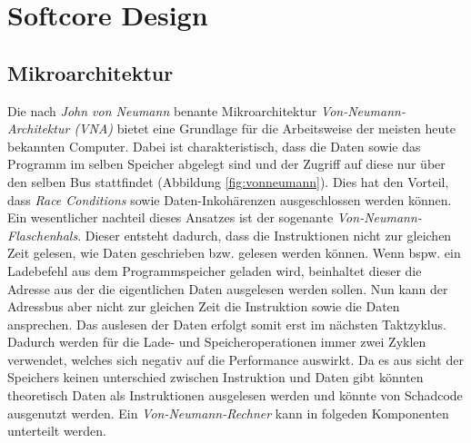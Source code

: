     \section{Softcore Design}

        \subsection{Mikroarchitektur}
            Die nach \textit{John von Neumann} benante Mikroarchitektur \textit{Von-Neumann-Architektur (VNA)}
            bietet eine Grundlage für die Arbeitsweise der meisten heute bekannten Computer.
            Dabei ist charakteristisch, dass die Daten sowie das Programm im selben Speicher abgelegt sind und
            der Zugriff auf diese nur über den selben Bus stattfindet (Abbildung \ref{fig:vonneumann}).
            Dies hat den Vorteil, dass \textit{Race Conditions} sowie Daten-Inkohärenzen ausgeschlossen werden können.
            Ein wesentlicher nachteil dieses Ansatzes ist der sogenante \textit{Von-Neumann-Flaschenhals}.
            Dieser entsteht dadurch, dass die Instruktionen nicht zur gleichen Zeit gelesen,
            wie Daten geschrieben bzw. gelesen werden können. Wenn bspw. ein Ladebefehl aus dem Programmspeicher
            geladen wird, beinhaltet dieser die Adresse aus der die eigentlichen Daten ausgelesen werden sollen.
            Nun kann der Adressbus aber nicht zur gleichen Zeit die Instruktion sowie die Daten ansprechen.
            Das auslesen der Daten erfolgt somit erst im nächsten Taktzyklus. Dadurch werden für
            die Lade- und Speicheroperationen immer zwei Zyklen verwendet, welches sich
            negativ auf die Performance auswirkt.
            Da es aus sicht der Speichers keinen unterschied zwischen Instruktion und Daten gibt
            könnten theoretisch Daten als Instruktionen ausgelesen werden und könnte von Schadcode ausgenutzt werden.
            Ein \textit{Von-Neumann-Rechner} kann in folgeden Komponenten unterteilt werden.

